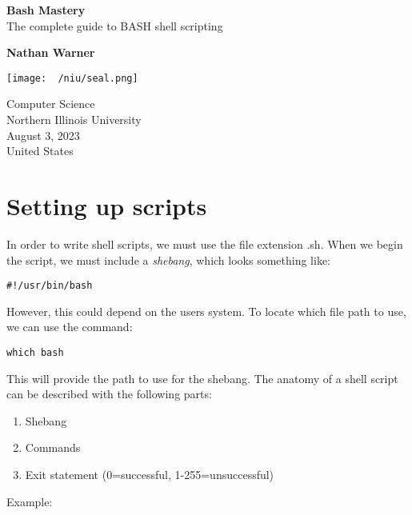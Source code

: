 \documentclass{report}
\title{\Huge{}}
\author{\huge{Nathan Warner}}
\date{\huge{}}
\begin{document}
        \begin{titlepage}
       \begin{center}
           \vspace*{1cm}
    
           \textbf{Bash Mastery} \\
           The complete guide to BASH shell scripting
    
           \vspace{0.5cm}
            
                
           \vspace{1.5cm}
    
           \textbf{Nathan Warner}
    
           \vfill
                
                
           \vspace{0.8cm}
         
           \texttt{[image: ~/niu/seal.png]}
                
           Computer Science \\
           Northern Illinois University\\
           August 3, 2023 \\
           United States\\
           
                
       \end{center}
    \end{titlepage}
    \tableofcontents
    \pagebreak \bigbreak \noindent
    \section{\LARGE Setting up scripts}
    \bigbreak \noindent 
    In order to write shell scripts, we must use the file extension .sh. When we begin the script, we must include a \textit{shebang}, which looks something like:
    \bigbreak \noindent 
    \begin{verbatim}
#!/usr/bin/bash
    \end{verbatim}
    \bigbreak \noindent 
    However, this could depend on the users system. To locate which file path to use, we can use the command:
    \begin{verbatim}
which bash
    \end{verbatim}
    \bigbreak \noindent 
    This will provide the path to use for the shebang.
    \bigbreak \noindent 
    The anatomy of a shell script can be described with the following parts:
    \bigbreak \noindent 
    \begin{enumerate}
        \item Shebang 
        \item Commands
        \item Exit statement (0=successful, 1-255=unsuccessful)
    \end{enumerate}
    \bigbreak \noindent 
    Example:
    \bigbreak \noindent 
    
\end{document}
